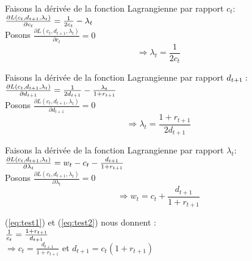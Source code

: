 \documentclass[11pt,twoside,a4paper]{article}
\begin{document}
Faisons la dérivée de la fonction Lagrangienne par rapport $c_t :  $ \\

$\\
\frac{\partial L(c_t,d_{t+1},\lambda_t)}{\partial c_t} = \frac{1}{2c_t} - \lambda_t 
$ \\
Posons  $ \frac{\partial L(c_t,d_{t+1},\lambda_t)}{\partial c_t} = 0  $ \\



\begin{equation}\label{eq:test1}
  \Rightarrow \lambda_t=\frac{1}{2c_t}
\end{equation} 


Faisons la dérivée de la fonction Lagrangienne par rapport $d_{t+1} : \\ $
$\\
\frac{\partial L(c_t,d_{t+1},\lambda_t)}{\partial d_{t+1}} = \frac{1}{2 d_{t+1}} - \frac{\lambda_t}{1+r_{t+1}} 
$\\

Posons  $ \frac{\partial L(c_t,d_{t+1},\lambda_t)}{\partial d_{t+1}} = 0 $ \\

  \begin{equation}\label{eq:test2}
  \Rightarrow \lambda_t=\frac{1+r_{t+1}}{2 d_{t+1}}
\end{equation}  

Faisons la dérivée de la fonction Lagrangienne par rapport $\lambda_t :  $ \\
$\\
\frac{\partial L(c_t,d_{t+1},\lambda_t)}{\partial \lambda_t} = w_t-c_t - \frac{d_{t+1}}{1+r_{t+1}} 
$ \\

Posons  $ \frac{\partial L(c_t,d_{t+1},\lambda_t)}{\partial \lambda_t} = 0 $ \\

 \begin{equation}\label{eq:test3}
  \Rightarrow w_t=c_t + \frac{d_{t+1}}{1+r_{t+1}}
\end{equation}
    

(\ref{eq:test1}) et (\ref{eq:test2}) nous donnent : \\
$\\
\frac{1}{c_t} = \frac{1+r_{t+1}}{d_{t+1}}\\
$\\
$ \Rightarrow c_t= \frac{d_{t+1}}{1+r_{t+1}}$  et  $ d_{t+1}= c_t ({1+r_{t+1}})$\\
\end{document}

